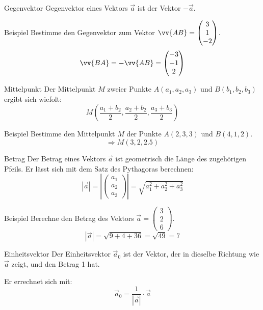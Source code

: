 \documentclass{article}
\begin{document}
\begin{boxx}[Red]{Gegenvektor}
    Gegenvektor eines Vektors $\vec{a}$ ist der Vektor $-\vec{a}$.
\end{boxx}
\begin{boxx}[DarkBlue]{Beispiel}
    Bestimme den Gegenvektor zum Vektor $\displaystyle \vv{AB} = \begin{pmatrix}3 \\ 1 \\ -2 \end{pmatrix}$.
    \[\vv{BA} = -\vv{AB} = \begin{pmatrix}-3 \\ -1 \\ 2\end{pmatrix}\]
\end{boxx}
\begin{boxx}[Red]{Mittelpunkt}
    Der Mittelpunkt $M$ zweier Punkte $A(a_1,a_2,a_3)$ und $B(b_1,b_2,b_3)$ ergibt sich wiefolt:
    \[M\left(\frac{a_1+b_2}{2}, \frac{a_2+b_2}{2}, \frac{a_3 + b_3}{2}\right)\]
\end{boxx}
\begin{boxx}[DarkBlue]{Beispiel}
    Bestimme den Mittelpunkt $M$ der Punkte $A(2,3,3)$ und $B(4,1,2)$.
    \[\Rightarrow M(3,2,2.5)\]
\end{boxx}
\begin{boxx}[Red]{Betrag}
    Der Betrag eines Vektors $\vec{a}$ ist geometrisch die Länge des zugehörigen Pfeils.
    Er lässt sich mit dem Satz des Pythagoras berechnen:
    \[|\vec{a}| = \left|\begin{pmatrix}
        a_1 \\ a_2 \\ a_3
    \end{pmatrix}\right| = \sqrt{a_1^2 + a_2^2 + a_3^2}\]
\end{boxx}
\begin{boxx}[DarkBlue]{Beispiel}
    Berechne den Betrag des Vektors $\displaystyle \vec{a} = \begin{pmatrix}3 \\ 2 \\ 6\end{pmatrix}$.
    \[|\vec{a}| = \sqrt{9 + 4 + 36} = \sqrt{49} = 7\]
\end{boxx}
\begin{boxx}[Red]{Einheitsvektor}
    Der Einheitsvektor $\vec{a}_0$ ist der Vektor, der in dieselbe Richtung wie $\vec{a}$ zeigt, und den Betrag 1 hat.
    
    Er errechnet sich mit:
    \[\vec{a}_0 = \frac{1}{|\vec{a}|} \cdot \vec{a}\]
\end{boxx} 
\end{document}
